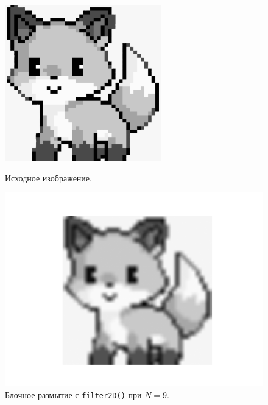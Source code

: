 \documentclass[a4paper]{article}
\begin{document}
\begin{figure}[H]
  \centering
  \begin{minipage}{0.49\textwidth}
    \centering
    \includegraphics[width=\textwidth]{src/grayscale.png}
    \caption{Исходное изображение.}  
  \end{minipage}
  \begin{minipage}{0.49\textwidth}
    \centering
    \includegraphics[width=\textwidth]{src/box_9.png}
    \caption{Блочное размытие с \texttt{filter2D()} при $N=9$.}
  \end{minipage}
\end{figure}
\end{document}
